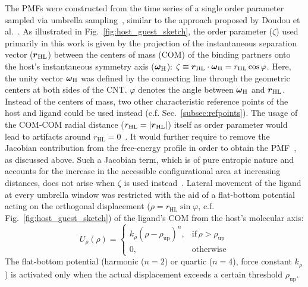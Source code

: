 \documentclass[9pt,lessons,pubversion]{livecoms}
\begin{document}
The PMFs were constructed from the time series of a single order parameter sampled via umbrella sampling~\cite{torrie1974monte, torrie1977nonphysical}, similar to the approach proposed by Doudou et al.~\cite{doudou2009standard}.
As illustrated in Fig.~\ref{fig:host_guest_sketch}, the order parameter ($\zeta$) used primarily in this work is given by the projection of the instantaneous separation vector 
($\text{\boldmath $r$}_\mathrm{HL}$) between the centers of mass (COM) of the binding partners onto the host's instantaneous symmetry axis ($\text{\boldmath$\omega$}_\mathrm{H}$):
$\zeta \equiv \text{\boldmath $r$}_\mathrm{HL} \cdot \text{\boldmath$\omega$}_\mathrm{H} = r_\mathrm{HL} \cos{\varphi}$. 
Here, the unity vector $\text{\boldmath$\omega$}_\mathrm{H}$ was defined by the connecting line through the geometric centers at both sides of the CNT.
$\varphi$ denotes the angle between $\text{\boldmath$\omega$}_\mathrm{H}$ and $\text{\boldmath $r$}_\mathrm{HL}$.
Instead of the centers of mass, two other characteristic reference points of the host and ligand could be used instead (c.f. Sec.~\ref{subsec:refpoints}).
The usage of the COM-COM radial distance ($r_\mathrm{HL} = |\text{\boldmath $r$}_\mathrm{HL}|$) itself as order parameter would lead to artifacts around $r_\mathrm{HL} = 0 $~\cite{you2019potential}.
It would further require to remove the Jacobian contribution from the free-energy profile in order to obtain the PMF~\cite{trzesniak2007comparison}, as discussed above.
Such a Jacobian term, which is of pure entropic nature and accounts for the increase in the accessible configurational area at increasing distances, does not arise when $\zeta$ is used instead~\cite{doudou2009standard}.
Lateral movement of the ligand at every umbrella window was restricted with the aid of a flat-bottom potential acting on the orthogonal displacement ($\rho = r_\mathrm{HL} \sin{\varphi}$, c.f. Fig.~\ref{fig:host_guest_sketch}) 
of the ligand's COM from the host's molecular axis:
\begin{equation}
U_\rho(\rho) = \left\{\begin{array}{ll} 
		k_\rho (\rho-\rho_\mathrm{up})^n, & \mathrm{if} \, \rho > \rho_\mathrm{up} \\
		0, & \mathrm{otherwise}
		\end{array}\right. 
\label{eq:ort_restr}
\end{equation}
The flat-bottom potential (harmonic ($n = 2$) or quartic ($n = 4$), force constant $k_\rho$) is activated only when the actual displacement exceeds a certain threshold $\rho_\mathrm{up}$.
\end{document}
